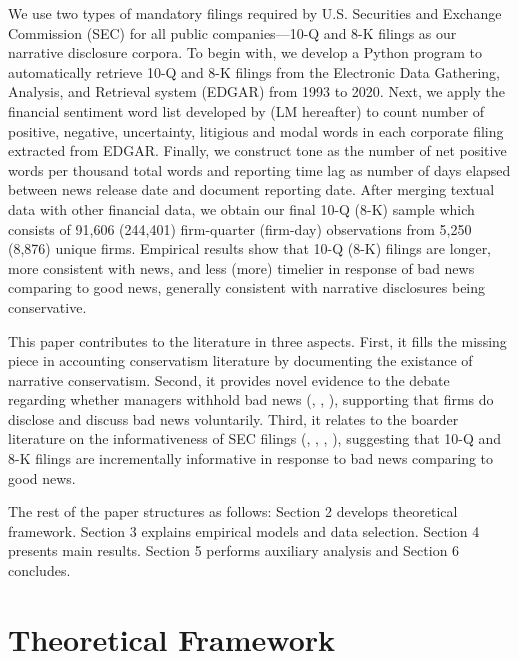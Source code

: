 \documentclass[a4paper]{article}
\begin{document}
\begin{spacing}{2}
We use two types of mandatory filings required by U.S. Securities and Exchange Commission (SEC) for all public companies---10-Q and 8-K filings as our narrative disclosure corpora. To begin with, we develop a Python program to automatically retrieve 10-Q and 8-K filings from the Electronic Data Gathering, Analysis, and Retrieval system (EDGAR) from 1993 to 2020. Next, we apply the financial sentiment word list developed by \cite{loughranWhenLiabilityNot2011} (LM hereafter) to count number of positive, negative, uncertainty, litigious and modal words in each corporate filing extracted from EDGAR. Finally, we construct tone as the number of net positive words per thousand total words and reporting time lag as number of days elapsed between news release date and document reporting date. After merging textual data with other financial data, we obtain our final 10-Q (8-K) sample which consists of 91,606 (244,401) firm-quarter (firm-day) observations from 5,250 (8,876) unique firms. Empirical results show that 10-Q (8-K) filings are longer, more consistent with news, and less (more) timelier in response of bad news comparing to good news, generally consistent with narrative disclosures being conservative. 


This paper contributes to the literature in three aspects. First, it fills the missing piece in accounting conservatism literature by documenting the existance of narrative conservatism. Second, it provides novel evidence to the debate regarding whether managers withhold bad news (\cite{baoManagersDiscloseWithhold2019}, \cite{kothariManagersWithholdBad2009}, \cite{skinnerWhyFirmsVoluntarily1994}), supporting that firms do disclose and discuss bad news voluntarily. Third, it relates to the boarder literature on the informativeness of SEC filings (\cite{lermanNewForm8K2010}, \cite{alfordExtensionsViolationsStatutory1994}, \cite{liAnnualReportReadability2008}, \cite{liInformationContentForwardLooking2010}), suggesting that 10-Q and 8-K filings are incrementally informative in response to bad news comparing to good news.

The rest of the paper structures as follows: Section 2 develops theoretical framework. Section 3 explains empirical models and data selection. Section 4 presents main results. Section 5 performs auxiliary analysis and Section 6 concludes.

\section{Theoretical Framework}

\end{spacing}
\end{document}
